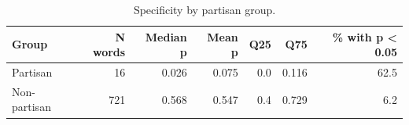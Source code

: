 \begin{table}[!h]
\centering
\caption{\label{tab:tab:specificity-summary}Specificity by partisan group.}
\centering
\begin{tabular}[t]{lrrrrrr}
\toprule
Group & N words & Median p & Mean p & Q25 & Q75 & \% with p < 0.05\\
\midrule
Partisan & 16 & 0.026 & 0.075 & 0.0 & 0.116 & 62.5\\
Non-partisan & 721 & 0.568 & 0.547 & 0.4 & 0.729 & 6.2\\
\bottomrule
\end{tabular}
\end{table}
